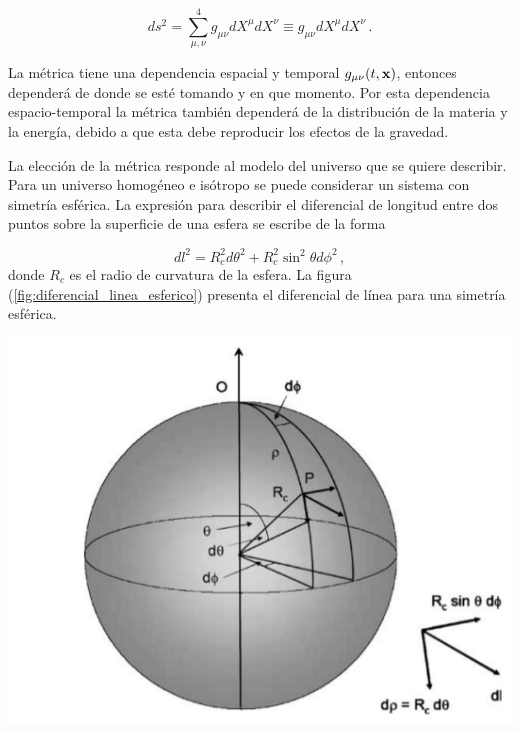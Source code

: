 \begin{equation}
ds^{2}=\sum_{\mu,\nu}^{4} g_{\mu\nu}dX^{\mu}dX^{\nu} \equiv g_{\mu\nu}dX^{\mu}dX^{\nu} \,.
\label{eq:tensor_metrico}
\end{equation}

La métrica tiene una dependencia espacial y temporal $g_{\mu\nu}(t,{\bf{x}})$, entonces dependerá de donde se esté tomando y en que momento. Por esta dependencia espacio-temporal la métrica también dependerá de la distribución de la materia y la energía, debido a que esta debe reproducir los efectos de la gravedad.

La elección de la métrica responde al modelo del universo que se quiere describir. Para un universo homogéneo e isótropo se puede considerar un sistema con simetría esférica. La expresión para describir el diferencial de longitud entre dos puntos sobre la superficie de una esfera se escribe de la forma

\begin{equation}
dl^{2}=R_{c}^{2}d\theta^{2}+R_{c}^{2}\sin^{2}\theta d\phi^{2} \,,
\label{metrica_esfera}
\end{equation}
%
donde $R_{c}$ es el radio de curvatura de la esfera. La figura (\ref{fig:diferencial_linea_esferico}) presenta el diferencial de línea para una simetría esférica.


\begin{center}
\includegraphics[scale=.4]{./figures/2_theoretical_framework/diferencial_linea.png}
\label{fig:diferencial_linea_esferico}
\end{center}


